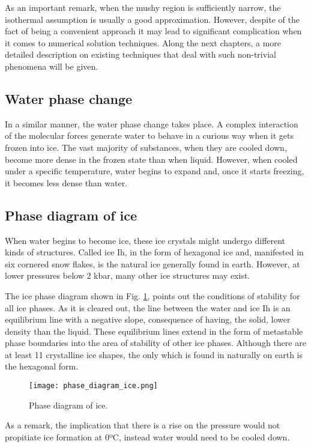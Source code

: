 \noindent As an important remark, when the mushy region is sufficiently narrow, the isothermal assumption is usually a good approximation. However, despite of the fact of being a convenient approach it may lead to significant complication when it comes to numerical solution techniques. 
\newline
\noindent Along the next chapters, a more detailed description on existing techniques that deal with such non-trivial phenomena will be given.

\subsection{Water phase change}
\setlength{\parindent}{0.5cm} In a similar manner, the water phase change takes place. A complex interaction of the molecular forces generate water to behave in a curious way when it gets frozen into ice. The vast majority of substances, when they are cooled down, become more dense in the frozen state than when liquid. However, when cooled under a specific temperature, water begins to expand and, once it starts freezing, it becomes less dense than water. 

\subsection{Phase diagram of ice}
\setlength{\parindent}{0.5cm} When water begins to become ice, these ice crystals might undergo different kinds of structures. Called ice Ih, in the form of hexagonal ice and, manifested in six cornered snow flakes, is the natural ice generally found in earth. However, at lower pressures below 2 kbar, many other ice structures may exist.

\noindent The ice phase diagram shown in Fig. \ref{1.6fig}, points out the conditions of stability for all ice phases. As it is cleared out, the line between the water and ice Ih is an equilibrium line with a negative slope, consequence of having, the solid, lower density than the liquid. These equilibrium lines extend in the form of metastable phase boundaries into the area of stability of other ice phases.
Although there are at least 11 crystalline ice shapes, the only which is found in naturally on earth is the hexagonal form. 
\begin{figure}[h!]
	\centering
	\texttt{[image: phase\_diagram\_ice.png]}
	\caption{Phase diagram of ice.} 
	\label{1.6fig}
\end{figure}
\newline
\noindent As a remark, the implication that there is a rise on the pressure would not propitiate ice formation at 0ºC, instead water would need to be cooled down.
